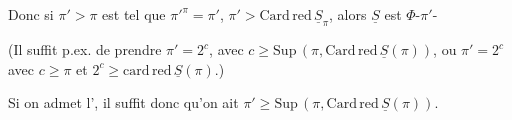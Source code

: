 Donc si $\pi'>\pi$ est tel que ${\pi'}^{\pi}=\pi'$, $\pi'>\mathrm{Card}\,\mathrm{red}\,\underline S_\pi$, alors $\underline S$ est $\Phi$-$\pi'$-

(Il suffit p.ex. de prendre $\pi'=2^c$, avec $c\geq\mathrm{Sup}\,(\pi,\mathrm{Card}\,\mathrm{red}\,\underline S(\pi))$, ou $\pi'=2^c$ avec $c\geq\pi$ et $2^c\geq\mathrm{card}\,\mathrm{red}\,\underline S(\pi)$.)

Si on admet l', il suffit donc qu'on ait $\pi'\geq\mathrm{Sup}\,(\pi,\mathrm{Card}\,\mathrm{red}\,\underline S(\pi))$.



